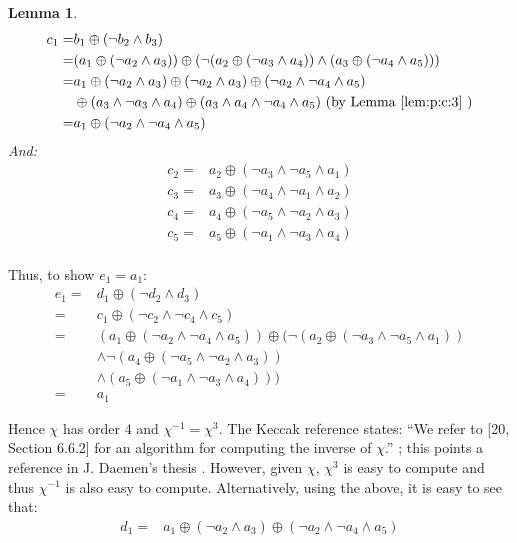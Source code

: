 \documentclass[10pt,twocolumn,twoside]{pnas-new}
\newtheorem{lemma}[theorem]{Lemma}
\begin{document}
\begin{lemma} \label{lem:p:c:4}
\begin{align*}
    c_1 = & b_1 \oplus (\lnot b_2 \land b_3) \\
        = & (a_1 \oplus (\lnot a_2 \land a_3)) \oplus (\lnot (a_2 \oplus (\lnot a_3 \land a_4)) \land (a_3 \oplus (\lnot a_4 \land a_5))) \\
        = & a_1 \oplus (\lnot a_2 \land a_3) \oplus (\lnot a_2 \land a_3) \oplus (\lnot a_2 \land \lnot a_4 \land a_5) \\
          & \oplus (a_3 \land \lnot a_3 \land a_4) \oplus (a_3 \land a_4 \land \lnot a_4 \land a_5) \text{ (by Lemma \ref{lem:p:c:3} )} \\
        = & a_1 \oplus (\lnot a_2 \land \lnot a_4 \land a_5) \\
\end{align*}
And:
\begin{align*}
    c_2 = & a_2 \oplus (\lnot a_3 \land \lnot a_5 \land a_1) \\
    c_3 = & a_3 \oplus (\lnot a_4 \land \lnot a_1 \land a_2) \\
    c_4 = & a_4 \oplus (\lnot a_5 \land \lnot a_2 \land a_3) \\
    c_5 = & a_5 \oplus (\lnot a_1 \land \lnot a_3 \land a_4) \\
\end{align*}
\end{lemma}

Thus, to show $e_1 = a_1$:
\begin{align*}
    e_1 = & d_1 \oplus (\lnot d_2 \land d_3) \\
        = & c_1 \oplus (\lnot c_2 \land \lnot c_4 \land c_5) \\
        = & (a_1 \oplus (\lnot a_2 \land \lnot a_4 \land a_5)) \oplus (\lnot (a_2 \oplus (\lnot a_3 \land \lnot a_5 \land a_1)) \\
          & \land \lnot (a_4 \oplus (\lnot a_5 \land \lnot a_2 \land a_3)) \\
          & \land (a_5 \oplus (\lnot a_1 \land \lnot a_3 \land a_4))) \\
        = & a_1
\end{align*}

Hence $\chi$ has order 4 and $\chi^{-1} = \chi^{3}$. The Keccak reference states:
``We refer to [20, Section 6.6.2] for an algorithm for computing the inverse of $\chi$.''
\cite{Keccak3}; this points a reference in J. Daemen's thesis \cite{DaemenThesis}.
However, given $\chi$, $\chi^{3}$ is easy to compute and thus $\chi^{-1}$ is also
easy to compute. Alternatively, using the above, it is easy to see that:
\begin{align*}
    d_1 = & a_1 \oplus (\lnot a_2 \land a_3) \oplus (\lnot a_2 \land \lnot a_4 \land a_5)
\end{align*}
\end{document}
